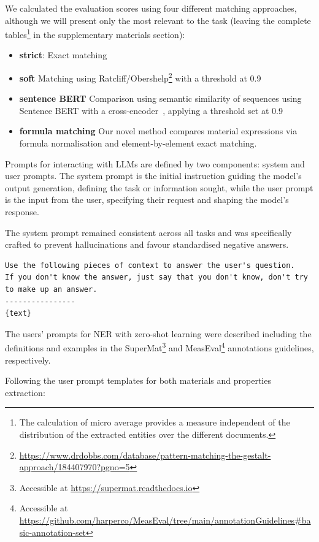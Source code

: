 \documentclass[a4paper]{article}
\begin{document}
We calculated the evaluation scores using four different matching approaches, although we will present only the most relevant to the task (leaving the complete tables\footnote{The calculation of micro average provides a measure independent of the distribution of the extracted entities over the different documents.} in the supplementary materials section): 
\begin{itemize}
    \item \textbf{strict}: Exact matching
    \item \textbf{soft} Matching using Ratcliff/Obershelp\footnote{\url{https://www.drdobbs.com/database/pattern-matching-the-gestalt-approach/184407970?pgno=5}} with a threshold at 0.9
    \item \textbf{sentence BERT} Comparison using semantic similarity of sequences using Sentence BERT with a cross-encoder~\cite{reimers2019sentencebert}, applying a threshold set at 0.9
    \item \textbf{formula matching} Our novel method compares material expressions via formula normalisation and element-by-element exact matching.
\end{itemize}

Prompts for interacting with LLMs are defined by two components: system and user prompts. 
The system prompt is the initial instruction guiding the model's output generation, defining the task or information sought, while the user prompt is the input from the user, specifying their request and shaping the model's response.

The system prompt remained consistent across all tasks and was specifically crafted to prevent hallucinations and favour standardised negative answers.

\begin{lstlisting}[caption=Generic system prompt common to all requests]
Use the following pieces of context to answer the user's question. 
If you don't know the answer, just say that you don't know, don't try to make up an answer. 
----------------
{text}
\end{lstlisting}


The users' prompts for NER with zero-shot learning were described including the definitions and examples in the SuperMat\footnote{Accessible at \url{https://supermat.readthedocs.io}} and MeasEval\footnote{Accessible at \url{https://github.com/harperco/MeasEval/tree/main/annotationGuidelines\#basic-annotation-set}} annotations guidelines, respectively.  


Following the user prompt templates for both materials and properties extraction: 
\end{document}
